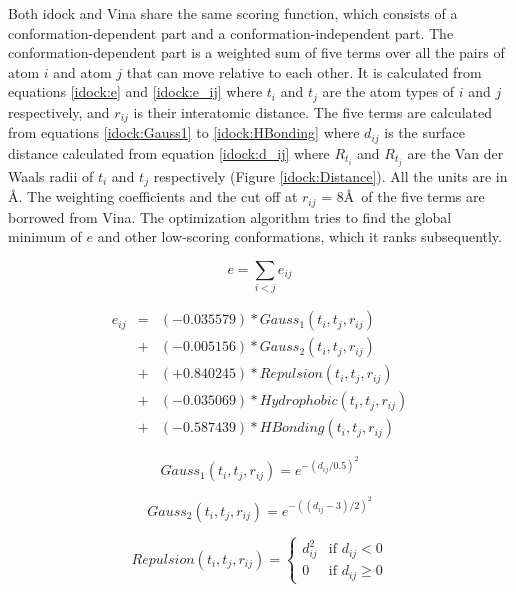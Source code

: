 Both idock and Vina share the same scoring function, which consists of a conformation-dependent part and a conformation-independent part. The conformation-dependent part is a weighted sum of five terms over all the pairs of atom $i$ and atom $j$ that can move relative to each other. It is calculated from equations \eqref{idock:e} and \eqref{idock:e_ij} where $t_i$ and $t_j$ are the atom types of $i$ and $j$ respectively, and $r_{ij}$ is their interatomic distance. The five terms are calculated from equations \eqref{idock:Gauss1} to \eqref{idock:HBonding} where $d_{ij}$ is the surface distance calculated from equation \eqref{idock:d_ij} where $R_{t_i}$ and $R_{t_j}$ are the Van der Waals radii of $t_i$ and $t_j$ respectively (Figure \ref{idock:Distance}). All the units are in \AA. The weighting coefficients and the cut off at $r_{ij}$ = 8\AA\ of the five terms are borrowed from Vina. The optimization algorithm tries to find the global minimum of $e$ and other low-scoring conformations, which it ranks subsequently.

\begin{equation}
\label{idock:e}
e = \sum_{i < j} e_{ij}
\end{equation}

\begin{eqnarray}
\label{idock:e_ij}
e_{ij} &=& (-0.035579) * Gauss_1(t_i, t_j, r_{ij}) \nonumber \\
       &+& (-0.005156) * Gauss_2(t_i, t_j, r_{ij}) \nonumber \\
       &+& (+0.840245) * Repulsion(t_i, t_j, r_{ij}) \nonumber \\
       &+& (-0.035069) * Hydrophobic(t_i, t_j, r_{ij}) \nonumber \\
       &+& (-0.587439) * HBonding(t_i, t_j, r_{ij})
\end{eqnarray}

\begin{equation}
\label{idock:Gauss1}
Gauss_1(t_i, t_j, r_{ij}) = e^{-(d_{ij} / 0.5)^2}
\end{equation}

\begin{equation}
\label{idock:Gauss2}
Gauss_2(t_i, t_j, r_{ij}) = e^{-((d_{ij} - 3) / 2)^2}
\end{equation}

\begin{equation}
\label{idock:Repulsion}
Repulsion(t_i, t_j, r_{ij}) =
\begin{cases}
d_{ij}^2 & \text{if } d_{ij} < 0\\
0 &\text{if } d_{ij} \geq 0
\end{cases}
\end{equation}

